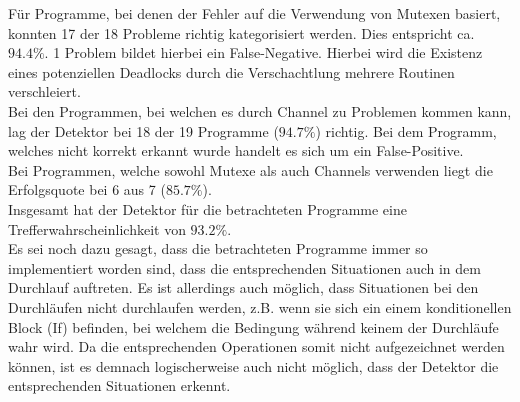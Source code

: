 Für Programme, bei denen der Fehler auf die Verwendung von Mutexen 
basiert, konnten 17 der 18 Probleme richtig kategorisiert werden. 
Dies entspricht ca. $94.4\%$. 1 Problem bildet hierbei ein False-Negative.
Hierbei wird die Existenz eines potenziellen Deadlocks durch die 
Verschachtlung mehrere Routinen verschleiert.\\
Bei den Programmen, bei welchen es durch Channel zu Problemen kommen kann, 
lag der Detektor bei 18 der 19 Programme ($94.7\%$) richtig. Bei dem 
Programm, welches nicht korrekt erkannt wurde handelt es sich um ein False-Positive.\\
Bei Programmen, welche sowohl Mutexe als auch Channels verwenden liegt 
die Erfolgsquote bei 6  aus 7 ($85.7\%$). \\
Insgesamt hat der Detektor für die betrachteten Programme eine 
Trefferwahrscheinlichkeit von $93.2\%$. \\
Es sei noch dazu gesagt, dass die betrachteten Programme immer so implementiert 
worden sind, dass die entsprechenden Situationen auch in dem Durchlauf 
auftreten. Es ist allerdings auch möglich, dass Situationen bei den Durchläufen 
nicht durchlaufen werden, z.B. wenn sie sich ein einem konditionellen 
Block (If) befinden, bei welchem die Bedingung während keinem der Durchläufe 
wahr wird. Da die entsprechenden Operationen somit nicht aufgezeichnet 
werden können, ist es demnach logischerweise auch nicht möglich, dass der 
Detektor die entsprechenden Situationen erkennt.




